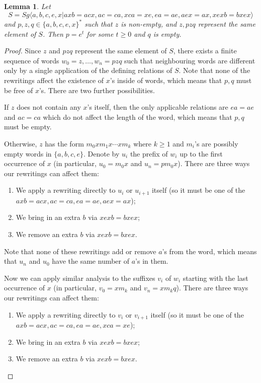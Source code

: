\documentclass{article}
\newtheorem{lemma}{Lemma}
\theoremstyle{definition}
\begin{document}
\begin{lemma}\label{lem_clarissues}
Let $$S = Sg \langle a,b,c,e,x | axb = acx, ac = ca, xca = xe, ea = ae, aex = ax, xexb = bxex \rangle$$ and $p,z,q \in \{a,b,c,e,x\}^*$ such that $z$ is non-empty, and $z, pzq$ represent the same element of $S$. Then $p = e^t$ for some $t \ge 0$ and $q$ is empty.
\end{lemma}
\begin{proof}
Since $z$ and $pzq$ represent the same element of $S$, there exists a finite sequence of words $w_0 = z, \ldots, w_n = p z q$ such that neighbouring words are different only by a single application of the defining relations of $S$.  Note that none of the rewritings affect the existence of $x$'s inside of words, which means that $p,q$ must be free of $x$'s. There are two further possibilities.

If $z$ does not contain any $x$'s itself, then the only applicable relations are $ea = ae$ and $ac = ca$ which do not affect the length of the word, which means that $p,q$ must be empty.

Otherwise, $z$ has the form $m_0 x m_1 x \cdots x m_k$ where $k \ge 1$ and $m_i$'s are possibly empty words in $\{a,b,c,e\}$. Denote by $u_i$ the prefix of $w_i$ up to the first occurrence of $x$ (in particular, $u_0 = m_0 x$ and $u_n = p m_0 x$). There are three ways our rewritings can affect them:

\begin{enumerate}
\item We apply a rewriting directly to $u_i$ or $u_{i+1}$ itself (so it must be one of the $axb = acx, ac=ca, ea = ae, aex = ax$);
\item We bring in an extra $b$ via $xexb = bxex$;
\item We remove an extra $b$ via $xexb = bxex$.
\end{enumerate}

Note that none of these rewritings add or remove $a$'s from the word, which means that $u_n$ and $u_0$ have the same number of $a$'s in them.

Now we can apply similar analysis to the suffixes $v_i$ of $w_i$ starting with the last occurrence of $x$ (in particular, $v_0 =x m_k$ and $v_n = x m_k q$). There are three ways our rewritings can affect them:

\begin{enumerate}
\item We apply a rewriting directly to $v_i$ or $v_{i+1}$ itself (so it must be one of the $axb = acx, ac=ca, ea = ae, xca = xe$);
\item We bring in an extra $b$ via $xexb = bxex$;
\item We remove an extra $b$ via $xexb = bxex$.
\end{enumerate}


\end{proof}
\end{document}
